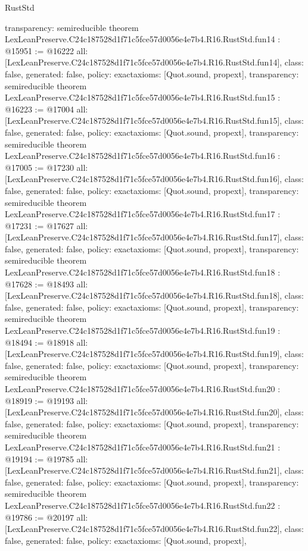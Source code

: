 \begin{lexlean}{RustStd}
\begin{coremodule}
{  transparency: semireducible
}
theorem LexLeanPreserve.C24c187528d1f71c5fce57d0056e4e7b4.R16.RustStd.fun14 : @15951 := @16222 {
  all: [LexLeanPreserve.C24c187528d1f71c5fce57d0056e4e7b4.R16.RustStd.fun14],
  class: false,
  generated: false,
  policy: exact{axioms: [Quot.sound, propext]},
  transparency: semireducible
}
theorem LexLeanPreserve.C24c187528d1f71c5fce57d0056e4e7b4.R16.RustStd.fun15 : @16223 := @17004 {
  all: [LexLeanPreserve.C24c187528d1f71c5fce57d0056e4e7b4.R16.RustStd.fun15],
  class: false,
  generated: false,
  policy: exact{axioms: [Quot.sound, propext]},
  transparency: semireducible
}
theorem LexLeanPreserve.C24c187528d1f71c5fce57d0056e4e7b4.R16.RustStd.fun16 : @17005 := @17230 {
  all: [LexLeanPreserve.C24c187528d1f71c5fce57d0056e4e7b4.R16.RustStd.fun16],
  class: false,
  generated: false,
  policy: exact{axioms: [Quot.sound, propext]},
  transparency: semireducible
}
theorem LexLeanPreserve.C24c187528d1f71c5fce57d0056e4e7b4.R16.RustStd.fun17 : @17231 := @17627 {
  all: [LexLeanPreserve.C24c187528d1f71c5fce57d0056e4e7b4.R16.RustStd.fun17],
  class: false,
  generated: false,
  policy: exact{axioms: [Quot.sound, propext]},
  transparency: semireducible
}
theorem LexLeanPreserve.C24c187528d1f71c5fce57d0056e4e7b4.R16.RustStd.fun18 : @17628 := @18493 {
  all: [LexLeanPreserve.C24c187528d1f71c5fce57d0056e4e7b4.R16.RustStd.fun18],
  class: false,
  generated: false,
  policy: exact{axioms: [Quot.sound, propext]},
  transparency: semireducible
}
theorem LexLeanPreserve.C24c187528d1f71c5fce57d0056e4e7b4.R16.RustStd.fun19 : @18494 := @18918 {
  all: [LexLeanPreserve.C24c187528d1f71c5fce57d0056e4e7b4.R16.RustStd.fun19],
  class: false,
  generated: false,
  policy: exact{axioms: [Quot.sound, propext]},
  transparency: semireducible
}
theorem LexLeanPreserve.C24c187528d1f71c5fce57d0056e4e7b4.R16.RustStd.fun20 : @18919 := @19193 {
  all: [LexLeanPreserve.C24c187528d1f71c5fce57d0056e4e7b4.R16.RustStd.fun20],
  class: false,
  generated: false,
  policy: exact{axioms: [Quot.sound, propext]},
  transparency: semireducible
}
theorem LexLeanPreserve.C24c187528d1f71c5fce57d0056e4e7b4.R16.RustStd.fun21 : @19194 := @19785 {
  all: [LexLeanPreserve.C24c187528d1f71c5fce57d0056e4e7b4.R16.RustStd.fun21],
  class: false,
  generated: false,
  policy: exact{axioms: [Quot.sound, propext]},
  transparency: semireducible
}
theorem LexLeanPreserve.C24c187528d1f71c5fce57d0056e4e7b4.R16.RustStd.fun22 : @19786 := @20197 {
  all: [LexLeanPreserve.C24c187528d1f71c5fce57d0056e4e7b4.R16.RustStd.fun22],
  class: false,
  generated: false,
  policy: exact{axioms: [Quot.sound, propext]},
}
\end{coremodule}
\end{lexlean}
